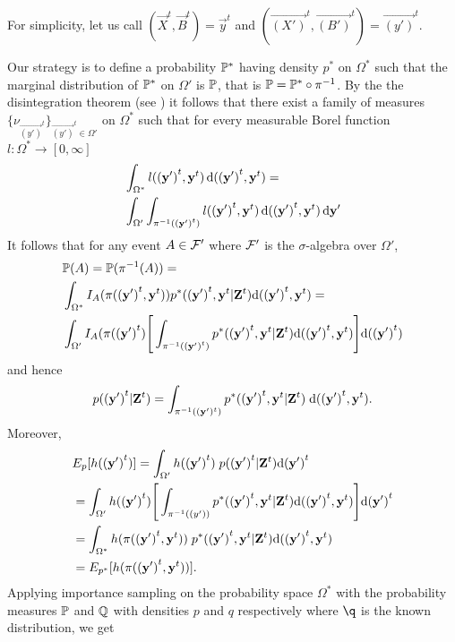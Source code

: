 For simplicity, let us call $(\vec{X}^{t}, \vec{B}^{t}) = \vec{y}^{t}$ and $(\vec{(X')}^{t}, \vec{(B')}^{t}) = \vec{(y')}^{t}$.

Our strategy is to define a probability $\P^*$ having density $p^*$ on $\Omega^*$ such that the marginal distribution of $\P^*$ on $\Omega'$ is $\P$, that is $\P = \P^* \circ \pi^{-1}$. By the the disintegration theorem (see \cite{Rohlin}) it follows that there exist a family of measures $\{ \nu_{\vec{(y')}^t} \}_{\vec{(y')}^t \in \Omega'}$ on $\Omega^*$ such that for every measurable Borel function $l:\Omega^* \rightarrow [0, \infty]$
\begin{align*}
    &\int_{\Omega^*} l(\vec{(y')}^t, \vec{y}^t)\diff (\vec{(y')}^t,\vec{y}^t) = \\
    & \int_{\Omega'}\int_{\pi^{-1}(\vec{(y')}^t)} l(\vec{(y')}^t, \vec{y}^t) \diff (\vec{(y')}^t, \vec{y}^t) \diff \vec{\vec{y'}}
\end{align*}
It follows that for any event $A \in \F'$ where $\F'$ is the $\sigma$-algebra over $\Omega'$,
\begin{align*}
    &\P(A) = \P(\pi^{-1}(A)) = \\
    &\int_{\Omega^*} I_A(\pi(\vec{(y')}^t, \vec{y}^t)) p^*(\vec{(y')}^t, \vec{y}^t | \vec{Z}^t) \D (\vec{(y')}^t, \vec{y}^t) = \\
    & \int_{\Omega'} I_A(\pi(\vec{(y')}^t) \Bigg[ \int_{\pi^{-1}(\vec{(y')}^t)} p^*(\vec{(y')}^t, \vec{y}^t | \vec{Z}^t) \D (\vec{(y')}^t, \vec{y}^t) \Bigg] \D (\vec{(y')}^t)
\end{align*}
and hence
\begin{equation*}
    p(\vec{(y')}^t | \vec{Z}^t) = \int_{\pi^{-1}((\vec{y}')^t)} p^*(\vec{(y')}^t, \vec{y}^t | \vec{Z}^t)\; \D (\vec{(y')}^t, \vec{y}^t).
\end{equation*}
Moreover,
\begin{align*}
    &E_{p}[h(\vec{(y')}^{t})]  = \int_{\Omega'} h(\vec{(y')}^{t})\; p(\vec{(y')}^{t} | \vec{Z}^{t}) \D \vec{(y')}^{t} \\
    &= \int_{\Omega'} h(\vec{(y')}^{t})\Bigg[\int_{\pi^{-1}(\vec(y'))} p^*(\vec{(y')}^{t}, \vec{y}^{t} | \vec{Z}^{t}) \D (\vec{(y')}^t, \vec{y}^t) \Bigg] \D \vec{(y')}^{t} \\ 
    &= \int_{\Omega^*} h(\pi(\vec{(y')}^{t}, \vec{y}^{t}))\; p^*(\vec{(y')}^{t}, \vec{y}^{t} | \vec{Z}^{t}) \D (\vec{(y')}^t, \vec{y}^t) \\ 
    &= E_{p^*}[h(\pi (\vec{(y')}^{t}, \vec{y}^{t}))].
\end{align*}
Applying importance sampling on the probability space $\Omega^*$ with the probability measures $\P$ and $\Q$ with densities $p$ and $q$ respectively where $\q$ is the known distribution, we get
